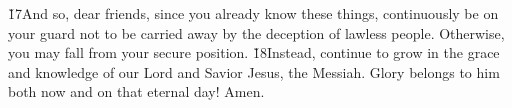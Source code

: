 \v{17}And so, dear friends, since you already know these things, continuously be on your guard not to be carried away by the deception of lawless people. Otherwise, you may fall from your secure position. \v{18}Instead, continue to grow in the grace and knowledge of our Lord and Savior Jesus, the Messiah. Glory belongs to him both now and on that eternal day! Amen.
